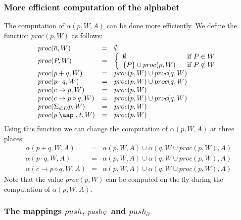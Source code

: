 \documentclass{article}
\providecommand{\at}{\mathbin{\mbox{\aap ,}}}
\begin{document}
\subsubsection{More efficient computation of the alphabet}

The computation of $\alpha (p,W,A)$ can be done more efficiently. We define
the function $proc(p,W)$ as follows:%
\[
\begin{array}{lll}
proc(\overline{a},W) & = & \emptyset  \\
proc(P,W) & = & \left\{
\begin{array}{ll}
\emptyset  & \text{if }P\in W \\
\{P\}\cup proc(p,W) & \text{if }P\notin W%
\end{array}%
\right.  \\
proc(p+q,W) & = & proc(p,W)\cup proc(q,W) \\
proc(p\cdot q,W) & = & proc(p,W)\cup proc(q,W) \\
proc(c\rightarrow p,W) & = & proc(p,W) \\
proc(c\rightarrow p\diamond q,W) & = & proc(p,W)\cup proc(q,W) \\
proc(\Sigma _{d:D}p,W) & = & proc(p,W) \\
proc(p\at t,W) & = & proc(p,W)%
\end{array}%
\]%
Using this function we can change the computation of $\alpha (p,W,A)$ at
three places:%
\[
\begin{array}{lll}
\alpha (p+q,W,A) & = & \alpha (p,W,A)\cup \alpha (q,W\cup proc(p,W),A) \\
\alpha (p\cdot q,W,A) & = & \alpha (p,W,A)\cup \alpha (q,W\cup proc(p,W),A)
\\
\alpha (c\rightarrow p\diamond q,W,A) & = & \alpha (p,W,A)\cup \alpha
(q,W\cup proc(p,W),A)%
\end{array}%
\]%
Note that the value $proc(p,W)$ can be computed on the fly during the
computation of $\alpha (p,W,A)$.

\subsubsection{The mappings $push$, $push_{\protect\nabla }$ and $%
push_{\partial }$}
\end{document}
